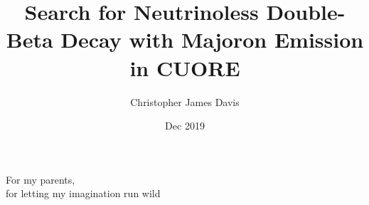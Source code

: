 \documentclass[12 pt]{mythesis}
\author{Christopher James Davis}
\title{Search for Neutrinoless Double-Beta Decay with Majoron Emission in CUORE}
\date{Dec 2019}
\begin{document}
\frontmatter

\maketitle

\makecopyright


\tableofcontents
\listoffigures
\listoftables

\clearpage

\mainmatter



\begin{flushright}
\null {}
For my parents, \\
for letting my imagination run wild
\null
\end{flushright}









\backmatter


\appendix


\end{document}
